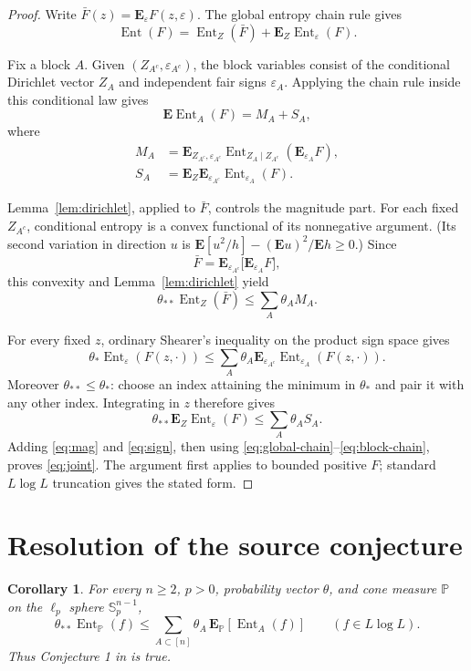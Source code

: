 \documentclass[11pt,a4paper]{article}
\newtheorem{corollary}{Corollary}
\newcommand{\E}{\mathbf E}
\newcommand{\Ent}{\operatorname{Ent}}
\newcommand{\eps}{\varepsilon}
\begin{document}
\begin{proof}
Write $\bar F(z)=\E_\eps F(z,\eps)$.  The global entropy chain rule gives
\begin{equation}\label{eq:global-chain}
 \Ent(F)=\Ent_Z(\bar F)+\E_Z\Ent_\eps(F).
\end{equation}

Fix a block $A$.  Given $(Z_{A^c},\eps_{A^c})$, the block variables consist
of the conditional Dirichlet vector $Z_A$ and independent fair signs $\eps_A$.
Applying the chain rule inside this conditional law gives
\begin{equation}\label{eq:block-chain}
 \E\Ent_A(F)=M_A+S_A,
\end{equation}
where
\begin{align*}
 M_A&=\E_{Z_{A^c},\eps_{A^c}}
 \Ent_{Z_A\mid Z_{A^c}}\!\left(\E_{\eps_A}F\right),\\
 S_A&=\E_Z\E_{\eps_{A^c}}\Ent_{\eps_A}(F).
\end{align*}

Lemma~\ref{lem:dirichlet}, applied to $\bar F$, controls the magnitude part.
For each fixed $Z_{A^c}$, conditional entropy is a convex functional of its
nonnegative argument.  (Its second variation in direction $u$ is
$\E[u^2/h]-(\E u)^2/\E h\ge0$.)  Since
\[
 \bar F=\E_{\eps_{A^c}}\bigl[\E_{\eps_A}F\bigr],
\]
this convexity and Lemma~\ref{lem:dirichlet} yield
\begin{equation}\label{eq:mag}
 \theta_{**}\Ent_Z(\bar F)
 \le\sum_A\theta_A M_A.
\end{equation}

For every fixed $z$, ordinary Shearer's inequality on the product sign space
gives
\[
 \theta_*\Ent_\eps(F(z,\cdot))
 \le\sum_A\theta_A\E_{\eps_{A^c}}\Ent_{\eps_A}(F(z,\cdot)).
\]
Moreover $\theta_{**}\le\theta_*$: choose an index attaining the minimum in
$\theta_*$ and pair it with any other index.  Integrating in $z$ therefore
gives
\begin{equation}\label{eq:sign}
 \theta_{**}\E_Z\Ent_\eps(F)\le\sum_A\theta_A S_A.
\end{equation}
Adding \eqref{eq:mag} and \eqref{eq:sign}, then using
\eqref{eq:global-chain}--\eqref{eq:block-chain}, proves \eqref{eq:joint}.
The argument first applies to bounded positive $F$; standard $L\log L$
truncation gives the stated form.
\end{proof}

\section*{Resolution of the source conjecture}
\begin{corollary}\label{cor:lp}
For every $n\ge2$, $p>0$, probability vector $\theta$, and cone measure
$\mathbb P$ on the $\ell_p$ sphere $\mathbb S_p^{n-1}$,
\[
 \theta_{**}\Ent_{\mathbb P}(f)
 \le\sum_{A\subset[n]}\theta_A\,
       \E_{\mathbb P}[\Ent_A(f)]
 \qquad(f\in L\log L).
\]
Thus Conjecture 1 in \cite{CS} is true.
\end{corollary}
\end{document}
